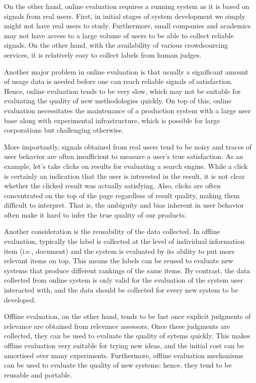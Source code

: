 On the other hand, online evaluation requires a running system as it is based on signals from real users. First, in initial stages of system development we simply might not have real users to study. Furthermore, small companies and academics may not have access to a large volume of users to be able to collect reliable signals. On the other hand, with the availability of various crowdsourcing services, it is relatively easy to collect labels from human judges.

Another major problem in online evaluation is that usually a significant amount of usage data is needed before one can reach reliable signals of satisfaction. Hence, online evaluation tends to be very slow, which may not be suitable for evaluating the quality of new methodologies quickly. On top of this, online evaluation necessitates the maintenance of a production system with a large user base along with experimental infrastructure, which is possible for large corporations but challenging otherwise.

More importantly, signals obtained from real users tend to be noisy and traces of user behavior are often insufficient to measure a user's true satisfaction. As an example, let's take clicks on results for evaluating a search engine. While a click is certainly an indication that the user is interested in the result, it is not clear whether the clicked result was actually satisfying. Also, clicks are often concentrated on the top of the page regardless of result quality, making them difficult to interpret. That is, the ambiguity and bias inherent in user behavior often make it hard to infer the true quality of our products. 

Another consideration is the reusability of the data collected. In offline evaluation, typically the label is collected at the level of individual information item (i.e., document) and the system is evaluated by its ability to put more relevant items on top. This means the labels can be reused to evaluate new systems that produce different rankings of the same items. By contrast, the data collected from online system is only valid for the evaluation of the system user interacted with, and the data should be collected for every new system to be developed.

Offline evaluation, on the other hand, tends to be fast once explicit judgments of relevance are obtained from relevance assessors. Once these judgments are collected, they can be used to evaluate the quality of sytems quickly. This makes offline evaluation very suitable for trying new ideas, and the initial cost can be amortised over many experiments. Furthermore, offline evaluation mechanisms can be used to evaluate the quality of new systems; hence, they tend to be reusable and portable.

